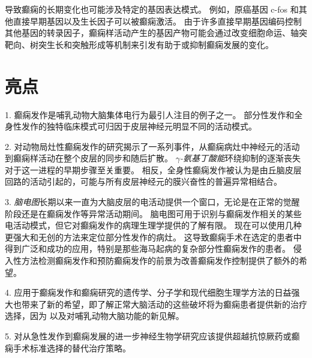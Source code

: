 导致癫痫的长期变化也可能涉及特定的基因表达模式。
例如，原癌基因 c-fos 和其他直接早期基因以及生长因子可以被癫痫激活。
由于许多直接早期基因编码控制其他基因的转录因子，癫痫样活动产生的基因产物可能会通过改变细胞命运、轴突靶向、树突生长和突触形成等机制来引发有助于或抑制癫痫发展的变化。



\section{亮点}

1. 癫痫发作是哺乳动物大脑集体电行为最引人注目的例子之一。
部分性发作和全身性发作的独特临床模式可归因于皮层神经元明显不同的活动模式。


2. 对动物局灶性癫痫发作的研究揭示了一系列事件，从癫痫病灶中神经元的活动到癫痫样活动在整个皮层的同步和随后扩散。
\textit{$\gamma$-氨基丁酸能}环绕抑制的逐渐丧失对于这一进程的早期步骤至关重要。
相反，全身性癫痫发作被认为是由丘脑皮层回路的活动引起的，可能与所有皮层神经元的膜兴奋性的普遍异常相结合。


3. \textit{脑电图}长期以来一直为大脑皮层的电活动提供一个窗口，无论是在正常的觉醒阶段还是在癫痫发作等异常活动期间。
脑电图可用于识别与癫痫发作相关的某些电活动模式，但它对癫痫发作的病理生理学提供的了解有限。
现在可以使用几种更强大和无创的方法来定位部分性发作的病灶。
这导致癫痫手术在选定的患者中得到广泛和成功的应用，特别是那些海马起病的复杂部分性癫痫发作的患者。
侵入性方法检测癫痫发作和预防癫痫发作的前景为改善癫痫发作控制提供了额外的希望。


4. 应用于癫痫发作和癫痫研究的遗传学、分子学和现代细胞生理学方法的日益强大也带来了新的希望，即了解正常大脑活动的这些破坏将为癫痫患者提供新的治疗选择，因为 以及对哺乳动物大脑功能的新见解。


5. 对从急性发作到癫痫发展的进一步神经生物学研究应该提供超越抗惊厥药或癫痫手术标准选择的替代治疗策略。


